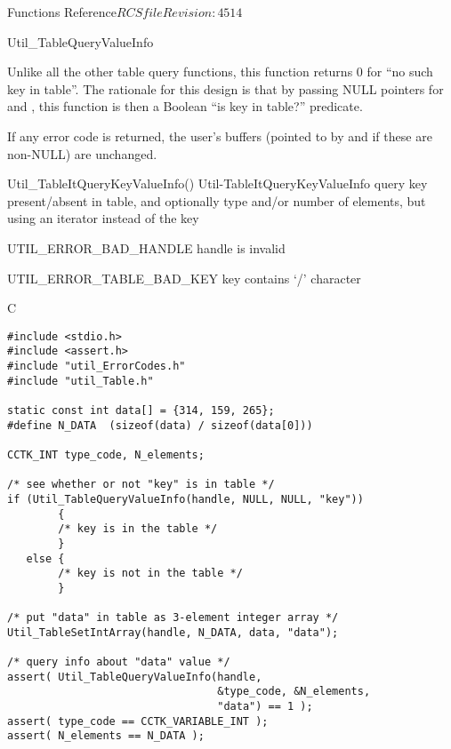 \begin{cactuspart}{ Functions Reference}{$RCSfile$}{$Revision: 4514 $}
\begin{FunctionDescription}{Util\_TableQueryValueInfo}
\begin{Discussion}
Unlike all the other table query functions, this function returns
0 for ``no such key in table''.  The rationale for this design is that
by passing NULL pointers for  and , this
function is then a Boolean ``is key in table?'' predicate.

If any error code is returned, the user's buffers (pointed to by
 and  if these are non-NULL) are
unchanged.
\end{Discussion}

\begin{SeeAlsoSection}
\begin{SeeAlso2} {Util\_TableItQueryKeyValueInfo()} {Util-TableItQueryKeyValueInfo}
query key present/absent in table, and optionally type and/or number
of elements, but using an iterator instead of the key
\end{SeeAlso2}
\end{SeeAlsoSection}

\begin{ErrorSection}
\begin{Error}{UTIL\_ERROR\_BAD\_HANDLE}
handle is invalid
\end{Error}
\begin{Error}{UTIL\_ERROR\_TABLE\_BAD\_KEY}
key contains `/' character
\end{Error}
\end{ErrorSection}

\begin{ExampleSection}
\begin{Example}{C}
\begin{verbatim}
#include <stdio.h>
#include <assert.h>
#include "util_ErrorCodes.h"
#include "util_Table.h"

static const int data[] = {314, 159, 265};
#define N_DATA  (sizeof(data) / sizeof(data[0]))

CCTK_INT type_code, N_elements;

/* see whether or not "key" is in table */
if (Util_TableQueryValueInfo(handle, NULL, NULL, "key"))
        {
        /* key is in the table */
        }
   else {
        /* key is not in the table */
        }

/* put "data" in table as 3-element integer array */
Util_TableSetIntArray(handle, N_DATA, data, "data");

/* query info about "data" value */
assert( Util_TableQueryValueInfo(handle,
                                 &type_code, &N_elements,
                                 "data") == 1 );
assert( type_code == CCTK_VARIABLE_INT );
assert( N_elements == N_DATA );
\end{verbatim}
\end{Example}
\end{ExampleSection}
\end{FunctionDescription}


\end{cactuspart}
